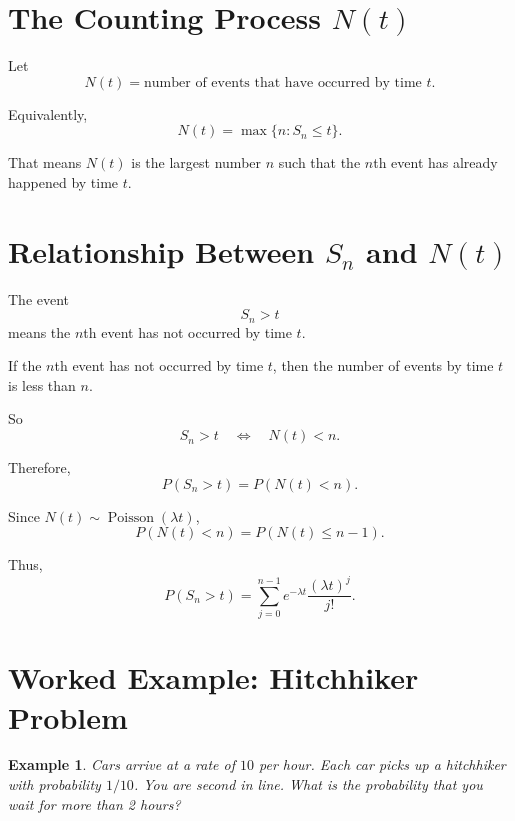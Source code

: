 \documentclass[12pt]{article}
\newtheorem{example}{Example}
\begin{document}
\section{The Counting Process \(N(t)\)}

Let
\[
N(t)=\text{number of events that have occurred by time }t.
\]

Equivalently,
\[
N(t)=\max\{n:S_n\leq t\}.
\]

That means \(N(t)\) is the largest number \(n\) such that the \(n\)th event has already happened by time \(t\).

\begin{center}
\end{center}

\section{Relationship Between \(S_n\) and \(N(t)\)}

The event
\[
S_n>t
\]
means the \(n\)th event has not occurred by time \(t\).

If the \(n\)th event has not occurred by time \(t\), then the number of events by time \(t\) is less than \(n\).

So
\[
S_n>t
\quad \Longleftrightarrow \quad
N(t)<n.
\]

Therefore,
\[
P(S_n>t)=P(N(t)<n).
\]

Since \(N(t)\sim \operatorname{Poisson}(\lambda t)\),
\[
P(N(t)<n)=P(N(t)\leq n-1).
\]

Thus,
\[
P(S_n>t)
=
\sum_{j=0}^{n-1}e^{-\lambda t}\frac{(\lambda t)^j}{j!}.
\]

\begin{center}
\end{center}

\section{Worked Example: Hitchhiker Problem}

\begin{example}
Cars arrive at a rate of \(10\) per hour. Each car picks up a hitchhiker with probability \(1/10\). You are second in line. What is the probability that you wait for more than 2 hours?
\end{example}
\end{document}
